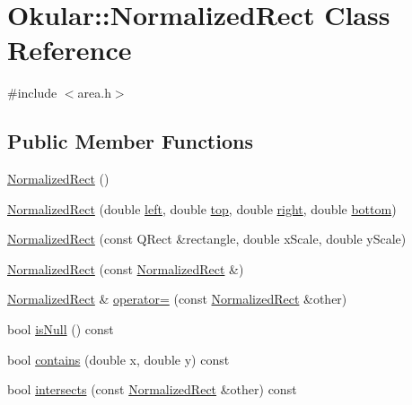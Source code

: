 \hypertarget{classOkular_1_1NormalizedRect}{\section{Okular\+:\+:Normalized\+Rect Class Reference}
\label{classOkular_1_1NormalizedRect}
}


{\ttfamily \#include $<$area.\+h$>$}

\subsection*{Public Member Functions}
\begin{DoxyCompactItemize}
\item 
\hyperlink{classOkular_1_1NormalizedRect_a80eb2d59743ac4e76c6781a63f4709b1}{Normalized\+Rect} ()
\item 
\hyperlink{classOkular_1_1NormalizedRect_a5708667255d23fcaf5afdc06705ea44c}{Normalized\+Rect} (double \hyperlink{classOkular_1_1NormalizedRect_a76336fe9d733f2b559cf8df3ef48f9e7}{left}, double \hyperlink{classOkular_1_1NormalizedRect_acfb70f6417c993508d50090b512cb954}{top}, double \hyperlink{classOkular_1_1NormalizedRect_a12bbdbb865e6282c9a325b61638553f4}{right}, double \hyperlink{classOkular_1_1NormalizedRect_a06fddfff238371f6f584360c0678741a}{bottom})
\item 
\hyperlink{classOkular_1_1NormalizedRect_a44d81e39483e48d6c81dee7b07df1c06}{Normalized\+Rect} (const Q\+Rect \&rectangle, double x\+Scale, double y\+Scale)
\item 
\hyperlink{classOkular_1_1NormalizedRect_a2818301f89fac54393b256c806ff4d2e}{Normalized\+Rect} (const \hyperlink{classOkular_1_1NormalizedRect}{Normalized\+Rect} \&)
\item 
\hyperlink{classOkular_1_1NormalizedRect}{Normalized\+Rect} \& \hyperlink{classOkular_1_1NormalizedRect_a4a9eaa560f4432747f45fe66fb790f37}{operator=} (const \hyperlink{classOkular_1_1NormalizedRect}{Normalized\+Rect} \&other)
\item 
bool \hyperlink{classOkular_1_1NormalizedRect_a8f9a332a6247f4716d23513af00ac045}{is\+Null} () const 
\item 
bool \hyperlink{classOkular_1_1NormalizedRect_ad9373aab8c5c6369cb0a9cbed2749d9b}{contains} (double x, double y) const 
\item 
bool \hyperlink{classOkular_1_1NormalizedRect_a9c2d89ccafd17802316c90406c6ec756}{intersects} (const \hyperlink{classOkular_1_1NormalizedRect}{Normalized\+Rect} \&other) const 

\end{DoxyCompactItemize}
